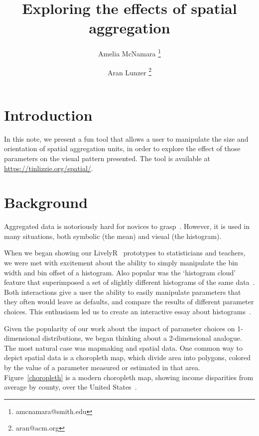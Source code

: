 \documentclass{article}\usepackage[]{graphicx}\usepackage[]{color}
\begin{document}
\title{Exploring the effects of spatial aggregation}
\author[1,2]{Amelia McNamara%
\thanks{amcnamara@smith.edu}}
\author[1,3]{Aran Lunzer%
\thanks{aran@acm.org}}

\maketitle

\section{Introduction}
In this note, we present a fun tool that allows a user to manipulate the size and orientation of spatial aggregation units, in order to explore the effect of those parameters on the visual pattern presented. The tool is available at \url{https://tinlizzie.org/spatial/}. 

\section{Background}
Aggregated data is notoriously hard for novices to grasp~\citep{KonHigRus2014, HanKap1992}. However, it is used in many situations, both symbolic (the mean) and visual (the histogram). 

When we began showing our LivelyR~\citep{LunMcN2014b} prototypes to statisticians and teachers, we were met with excitement about the ability to simply manipulate the bin width and bin offset of a histogram. Also popular was the `histogram cloud' feature that superimposed a set of slightly different histograms of the same data~\citep{McN2015b}. Both interactions give a user the ability to easily manipulate parameters that they often would leave as defaults, and compare the results of different parameter choices. This enthusiasm led us to create an interactive essay about histograms~\citep{LunMcN2017}. 

Given the popularity of our work about the impact of parameter choices on 1-dimensional distributions, we began thinking about a 2-dimensional analogue. The most natural case was mapmaking and spatial data. One common way to depict spatial data is a choropleth map, which divide area into polygons, colored by the value of a parameter measured or estimated in that area. Figure~\ref{choropleth} is a modern choropleth map, showing income disparities from average by county, over the United States~\citep{AisBut2015}. 
\end{document}
